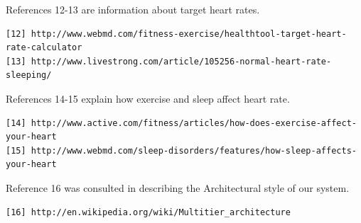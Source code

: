 \documentclass[letterpaper,english, 12pt]{scrreprt}
\begin{document}
References 12-13 are information about target heart rates.
\begin{verbatim}
[12] http://www.webmd.com/fitness-exercise/healthtool-target-heart-rate-calculator
[13] http://www.livestrong.com/article/105256-normal-heart-rate-sleeping/
\end{verbatim}

References 14-15 explain how exercise and sleep affect heart rate.
\begin{verbatim}
[14] http://www.active.com/fitness/articles/how-does-exercise-affect-your-heart
[15] http://www.webmd.com/sleep-disorders/features/how-sleep-affects-your-heart
\end{verbatim}

Reference 16 was consulted in describing the Architectural style of our system.
\begin{verbatim}
[16] http://en.wikipedia.org/wiki/Multitier_architecture
\end{verbatim}
\end{document}
